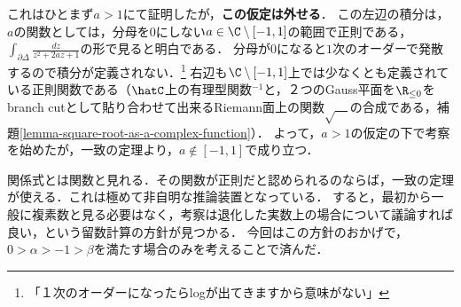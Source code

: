 \documentclass[uplatex, dvipdfmx]{jsreport}
\begin{document}
\begin{example}
    これはひとまず$a>1$にて証明したが，\textbf{この仮定は外せる}．
    この左辺の積分は，$a$の関数としては，分母を$0$にしない$a\in\C\setminus[-1,1]$の範囲で正則である，$\int_{\partial\Delta}\frac{dz}{z^2+2az+1}$の形で見ると明白である．
    分母が$0$になると$1$次のオーダーで発散するので積分が定義されない．\footnote{「１次のオーダーになったらlogが出てきますから意味がない」}
    右辺も$\C\setminus[-1,1]$上では少なくとも定義されている正則関数である（$\hatC$上の有理型関数${}^{-1}$と，２つのGauss平面を$\R_{\le 0}$をbranch cutとして貼り合わせて出来るRiemann面上の関数$\sqrt{\quad}$の合成である，補題\ref{lemma-square-root-as-a-complex-function}）．
    よって，$a>1$の仮定の下で考察を始めたが，一致の定理より，$a\notin[-1,1]$で成り立つ．
\end{example}
\begin{screen}
    \begin{remarks}[正則関数というデータ構造]
        関係式とは関数と見れる．その関数が正則だと認められるのならば，一致の定理が使える．これは極めて非自明な推論装置となっている．
        すると，最初から一般に複素数と見る必要はなく，考察は退化した実数上の場合について議論すれば良い，という留数計算の方針が見つかる．
        今回はこの方針のおかげで，$0>\alpha>-1>\beta$を満たす場合のみを考えることで済んだ．
    \end{remarks}
\end{screen}
\end{document}
